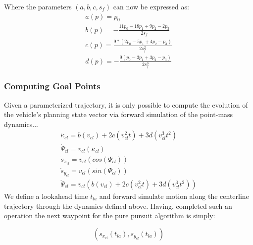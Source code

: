 Where the parameters $(a,b,c,s_f)$ can now be expressed as:
\begin{gather}
a(p)=p_0\\
b(p)=-\frac{11p_0 - 18p_1+9p_2-2p_3}{2s_f}\\
c(p)=\frac{9*(2p_0-5p_1+4p_2-p_3)}{2s_f^2}\\
d(p)=-\frac{9(p_0-3p_1 +3p_2-p_3)}{2s_f^3}
\end{gather}

\subsubsection{Computing Goal Points} 
Given a parameterized trajectory, it is only possible to compute the evolution of the vehicle's planning state vector via forward simulation of the point-mass dynamics...
\begin{gather}
	    \dot{\kappa}_{cl} = b\left(v_{cl}\right) + 2c\left(v_{cl}^{2}t\right) + 3d\left(v_{cl}^{3}t^{2}\right) \\
	    \dot{\Psi}_{cl}= v_{cl}\left(\kappa_{cl}\right)	\\
	    \dot{s}_{x_{cl}}= v_{cl}\left(cos(\Psi_{cl})\right)\\
	    \dot{s}_{y_{cl}}= v_{cl}\left(sin(\Psi_{cl})\right)\\
	    \ddot{\Psi}_{cl} =v_{cl} \left( b\left(v_{cl}\right) + 2c\left(v_{cl}^{2}t\right) + 3d\left(v_{cl}^{3}t^{2}\right) \right)	    
\end{gather}
We define a lookahead time $t_{la}$ and forward simulate motion along the centerline trajectory through the dynamics defined above. Having, completed such an operation the next waypoint for the pure pursuit algorithm is simply:

\begin{equation}
	\left(s_{x_{cl}}(t_{la}), s_{y_{cl}}(t_{la})\right)
\end{equation} 
